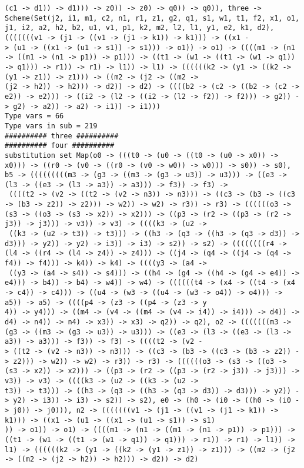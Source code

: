 \documentclass[11pt,oneside,a4paper]{report}
\begin{document}
\begin{lstlisting}[breaklines=true,caption={The output of an exponential type},label=lst:appedix:bigexp]
 (c1 -> d1)) -> d1))) -> z0)) -> z0) -> q0)) -> q0)), three -> Scheme(Set(j2, i1, m1, c2, n1, r1, z1, g2, q1, s1, w1, t1, f2, x1, o1, j1, i2, a2, h2, b2, u1, v1, p1, k2, m2, l2, l1, y1, e2, k1, d2),(((((((v1 -> (j1 -> ((v1 -> (j1 -> k1)) -> k1))) -> ((x1 -
> (u1 -> ((x1 -> (u1 -> s1)) -> s1))) -> o1)) -> o1) -> ((((m1 -> (n1 -> ((m1 -> (n1 -> p1)) -> p1))) -> ((t1 -> (w1 -> ((t1 -> (w1 -> q1)) -> q1))) -> r1)) -> r1) -> l1)) -> l1) -> ((((((k2 -> (y1 -> ((k2 -> (y1 -> z1)) -> z1))) -> ((m2 -> (j2 -> ((m2 ->
(j2 -> h2)) -> h2))) -> d2)) -> d2) -> ((((b2 -> (c2 -> ((b2 -> (c2 -> e2)) -> e2))) -> ((i2 -> (l2 -> ((i2 -> (l2 -> f2)) -> f2))) -> g2)) -> g2) -> a2)) -> a2) -> i1)) -> i1)))
Type vars = 66
Type vars in sub = 219
########## three ##########
########## four ##########
substitution set Map(o0 -> (((t0 -> (u0 -> ((t0 -> (u0 -> x0)) -> x0))) -> ((r0 -> (v0 -> ((r0 -> (v0 -> w0)) -> w0))) -> s0)) -> s0), b5 -> (((((((((m3 -> (g3 -> ((m3 -> (g3 -> u3)) -> u3))) -> ((e3 -> (l3 -> ((e3 -> (l3 -> a3)) -> a3))) -> f3)) -> f3) ->
 ((((t2 -> (v2 -> ((t2 -> (v2 -> n3)) -> n3))) -> ((c3 -> (b3 -> ((c3 -> (b3 -> z2)) -> z2))) -> w2)) -> w2) -> r3)) -> r3) -> ((((((o3 -> (s3 -> ((o3 -> (s3 -> x2)) -> x2))) -> ((p3 -> (r2 -> ((p3 -> (r2 -> j3)) -> j3))) -> v3)) -> v3) -> ((((k3 -> (u2 ->
 ((k3 -> (u2 -> t3)) -> t3))) -> ((h3 -> (q3 -> ((h3 -> (q3 -> d3)) -> d3))) -> y2)) -> y2) -> i3)) -> i3) -> s2)) -> s2) -> ((((((((r4 -> (l4 -> ((r4 -> (l4 -> z4)) -> z4))) -> ((j4 -> (q4 -> ((j4 -> (q4 -> f4)) -> f4))) -> k4)) -> k4) -> ((((y3 -> (a4 ->
 ((y3 -> (a4 -> s4)) -> s4))) -> ((h4 -> (g4 -> ((h4 -> (g4 -> e4)) -> e4))) -> b4)) -> b4) -> w4)) -> w4) -> ((((((t4 -> (x4 -> ((t4 -> (x4 -> c4)) -> c4))) -> ((u4 -> (w3 -> ((u4 -> (w3 -> o4)) -> o4))) -> a5)) -> a5) -> ((((p4 -> (z3 -> ((p4 -> (z3 -> y
4)) -> y4))) -> ((m4 -> (v4 -> ((m4 -> (v4 -> i4)) -> i4))) -> d4)) -> d4) -> n4)) -> n4) -> x3)) -> x3) -> q2)) -> q2), o2 -> (((((((m3 -> (g3 -> ((m3 -> (g3 -> u3)) -> u3))) -> ((e3 -> (l3 -> ((e3 -> (l3 -> a3)) -> a3))) -> f3)) -> f3) -> ((((t2 -> (v2 -
> ((t2 -> (v2 -> n3)) -> n3))) -> ((c3 -> (b3 -> ((c3 -> (b3 -> z2)) -> z2))) -> w2)) -> w2) -> r3)) -> r3) -> ((((((o3 -> (s3 -> ((o3 -> (s3 -> x2)) -> x2))) -> ((p3 -> (r2 -> ((p3 -> (r2 -> j3)) -> j3))) -> v3)) -> v3) -> ((((k3 -> (u2 -> ((k3 -> (u2 ->
t3)) -> t3))) -> ((h3 -> (q3 -> ((h3 -> (q3 -> d3)) -> d3))) -> y2)) -> y2) -> i3)) -> i3) -> s2)) -> s2), e0 -> (h0 -> (i0 -> ((h0 -> (i0 -> j0)) -> j0))), n2 -> (((((((v1 -> (j1 -> ((v1 -> (j1 -> k1)) -> k1))) -> ((x1 -> (u1 -> ((x1 -> (u1 -> s1)) -> s1)
)) -> o1)) -> o1) -> ((((m1 -> (n1 -> ((m1 -> (n1 -> p1)) -> p1))) -> ((t1 -> (w1 -> ((t1 -> (w1 -> q1)) -> q1))) -> r1)) -> r1) -> l1)) -> l1) -> ((((((k2 -> (y1 -> ((k2 -> (y1 -> z1)) -> z1))) -> ((m2 -> (j2 -> ((m2 -> (j2 -> h2)) -> h2))) -> d2)) -> d2)

\end{lstlisting}
\end{document}
